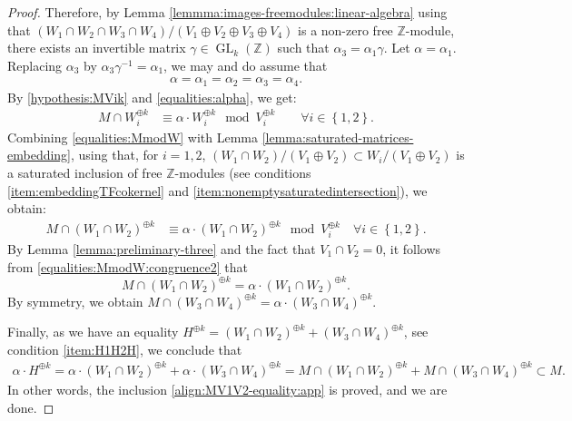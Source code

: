 \documentclass[a4paper,11pt,reqno]{amsart}
\numberwithin{equation}{section}
\theoremstyle{plain}
\theoremstyle{definition}
\newcommand{\Z}{\mathbb Z}
\newcommand{\GL}{\operatorname{GL}}
\newcommand{\set}[1]{\left\{ #1 \right\}}
\begin{document}
\begin{proof}
Therefore, by Lemma \ref{lemmma:images-freemodules:linear-algebra} using that $(W_1 \cap W_2 \cap W_3 \cap W_4)/(V_1 \oplus V_2 \oplus V_3 \oplus V_4)$ is a non-zero free $\Z$-module, there exists an invertible matrix $\gamma \in \GL_k(\Z)$ such that $\alpha_3 = \alpha_1 \gamma$. Let $\alpha = \alpha_1$. 
Replacing $\alpha_3$ by $\alpha_3\gamma^{-1} = \alpha_1$, we may and do assume that 
\begin{align} \label{equalities:alpha}
\alpha = \alpha_1 = \alpha_2 = \alpha_3 = \alpha_4. 
\end{align}
By \eqref{hypothesis:MVik} and \eqref{equalities:alpha}, we get:
\begin{align} \label{equalities:MmodW}
M \cap W_i^{\oplus k} &\equiv \alpha \cdot W_i^{\oplus k} \mod V_i^{\oplus k} \quad \quad  \forall i \in \set{1,2}. 
\end{align}
Combining \eqref{equalities:MmodW} with Lemma \ref{lemma:saturated-matrices-embedding}, using that, for $i = 1,2$, $(W_1 \cap W_2)/(V_1 \oplus V_2) \subset W_i/(V_1 \oplus V_2)$ is a saturated inclusion of free $\Z$-modules (see conditions \eqref{item:embeddingTFcokernel} and \eqref{item:nonemptysaturatedintersection}), we obtain:
\begin{align} \label{equalities:MmodW:congruence2}
M \cap \left(W_1 \cap W_2\right)^{\oplus k} &\equiv \alpha \cdot \left(W_1 \cap W_2\right)^{\oplus k} \mod V_i^{\oplus k} \quad \forall i \in \set{1,2}. 
\end{align}
By Lemma \ref{lemma:preliminary-three} and the fact that $V_1 \cap V_2 = 0$, it follows from \eqref{equalities:MmodW:congruence2} that
\[
M \cap \left(W_1 \cap W_2 \right)^{\oplus k} = \alpha \cdot \left(W_1 \cap W_2 \right)^{\oplus k}. 
\]
By symmetry, we obtain $
M \cap \left(W_3 \cap W_4 \right)^{\oplus k} = \alpha \cdot \left(W_3 \cap W_4 \right)^{\oplus k} 
$. 

Finally, as we have an equality $H^{\oplus k} = (W_1 \cap W_2 )^{\oplus k}  + (W_3 \cap W_4 )^{\oplus k}$, see condition \eqref{item:H1H2H}, we conclude that
\begin{align*}
\alpha \cdot H^{\oplus k} = \alpha \cdot 
\left(W_1 \cap W_2 \right)^{\oplus k} + \alpha \cdot \left(W_3 \cap W_4 \right)^{\oplus k} 
= 
M \cap \left(W_1 \cap W_2 \right)^{\oplus k} + M \cap \left(W_3 \cap W_4 \right)^{\oplus k} \subset M.
\end{align*}
In other words, the inclusion \eqref{align:MV1V2-equality:app} is proved, and we are done. 
\end{proof}
\end{document}
